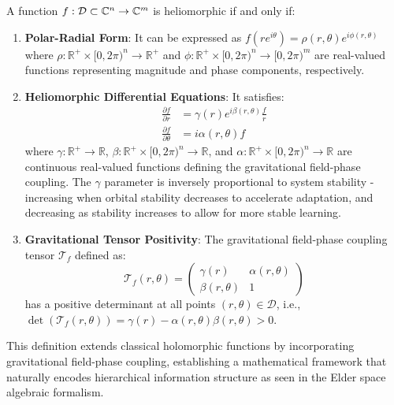 \begin{definition}
A function $f: \mathcal{D} \subset \mathbb{C}^n \rightarrow \mathbb{C}^m$ is heliomorphic if and only if:
\begin{enumerate}
    \item \textbf{Polar-Radial Form}: It can be expressed as $f(re^{i\theta}) = \rho(r,\theta)e^{i\phi(r,\theta)}$ where $\rho: \mathbb{R}^+ \times [0,2\pi)^n \rightarrow \mathbb{R}^+$ and $\phi: \mathbb{R}^+ \times [0,2\pi)^n \rightarrow [0,2\pi)^m$ are real-valued functions representing magnitude and phase components, respectively.
    
    \item \textbf{Heliomorphic Differential Equations}: It satisfies:
    \begin{align}
        \frac{\partial f}{\partial r} &= \gamma(r)e^{i\beta(r,\theta)}\frac{f}{r}\\
        \frac{\partial f}{\partial \theta} &= i\alpha(r,\theta)f
    \end{align}
    where $\gamma: \mathbb{R}^+ \rightarrow \mathbb{R}$, $\beta: \mathbb{R}^+ \times [0,2\pi)^n \rightarrow \mathbb{R}$, and $\alpha: \mathbb{R}^+ \times [0,2\pi)^n \rightarrow \mathbb{R}$ are continuous real-valued functions defining the gravitational field-phase coupling. The $\gamma$ parameter is inversely proportional to system stability - increasing when orbital stability decreases to accelerate adaptation, and decreasing as stability increases to allow for more stable learning.
    
    \item \textbf{Gravitational Tensor Positivity}: The gravitational field-phase coupling tensor $\mathcal{T}_f$ defined as:
    \begin{equation}
        \mathcal{T}_f(r,\theta) = \begin{pmatrix}
            \gamma(r) & \alpha(r,\theta)\\
            \beta(r,\theta) & 1
        \end{pmatrix}
    \end{equation}
    has a positive determinant at all points $(r,\theta) \in \mathcal{D}$, i.e., $\det(\mathcal{T}_f(r,\theta)) = \gamma(r) - \alpha(r,\theta)\beta(r,\theta) > 0$.
\end{enumerate}
\end{definition}

This definition extends classical holomorphic functions by incorporating gravitational field-phase coupling, establishing a mathematical framework that naturally encodes hierarchical information structure as seen in the Elder space algebraic formalism.

